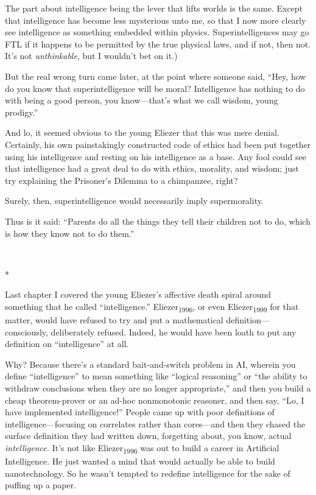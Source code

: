 {
 The part about intelligence being the lever that lifts worlds is
the same. Except that intelligence has become less mysterious unto me,
so that I now more clearly see intelligence as something embedded
within physics. Superintelligences may go FTL if it happens to be
permitted by the true physical laws, and if not, then not.
It's not \textit{unthinkable}, but I
wouldn't bet on it.)}

{
 But the real wrong turn came later, at the point where someone
said, ``Hey, how do you know that superintelligence
will be moral? Intelligence has nothing to do with being a good person,
you know---that's what we call wisdom, young
prodigy.''}

{
 And lo, it seemed obvious to the young Eliezer that this was mere
denial. Certainly, his own painstakingly constructed code of ethics had
been put together using his intelligence and resting on his
intelligence as a base. Any fool could see that intelligence had a
great deal to do with ethics, morality, and wisdom; just try explaining
the Prisoner's Dilemma to a chimpanzee, right?}

{
 Surely, then, superintelligence would necessarily imply
supermorality.}

{
 Thus is it said: ``Parents do all the things they
tell their children not to do, which is how they know not to do
them.''}

{\centering
 \ ~
\par}

{\centering
 *
\par}


{
 Last chapter I covered the young Eliezer's
affective death spiral around something that he called
``intelligence.''
Eliezer\textsubscript{1996}, or even Eliezer\textsubscript{1999} for
that matter, would have refused to try and put a mathematical
definition---consciously, deliberately refused. Indeed, he would have
been loath to put any definition on
``intelligence'' at all. }

{
 Why? Because there's a standard bait-and-switch
problem in AI, wherein you define
``intelligence'' to mean something
like ``logical reasoning'' or
``the ability to withdraw conclusions when they are no
longer appropriate,'' and then you build a cheap
theorem-prover or an ad-hoc nonmonotonic reasoner, and then say,
``Lo, I have implemented
intelligence!'' People came up with poor definitions
of intelligence---focusing on correlates rather than cores---and then
they chased the surface definition they had written down, forgetting
about, you know, actual \textit{intelligence.} It's not
like Eliezer\textsubscript{1996} was out to build a career in
Artificial Intelligence. He just wanted a mind that would actually be
able to build nanotechnology. So he wasn't tempted to
redefine intelligence for the sake of puffing up a paper.}

